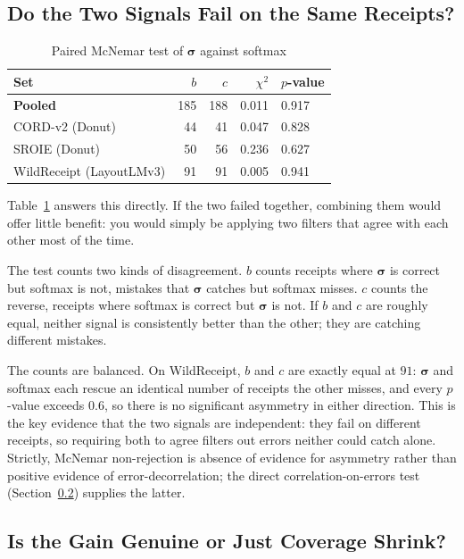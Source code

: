 \documentclass[conference]{IEEEtran}
\let\IEEEsigma\sigma
\DeclareRobustCommand{\sigma}{{\boldsymbol{\IEEEsigma}}}
\begin{document}
\subsection{Do the Two Signals Fail on the Same Receipts?}
\label{sec:results-mcnemar}

\begin{table}[t]
\centering\small
\caption{Paired McNemar test of $\sigma$ against softmax}
\label{tab:mcnemar}
\begin{tabular}{lrrrl}
\toprule
Set & $b$ & $c$ & $\chi^2$ & $p$-value \\
\midrule
\textbf{Pooled}            & 185 & 188 & 0.011 & 0.917 \\
CORD-v2     (Donut)        &  44 &  41 & 0.047 & 0.828 \\
SROIE       (Donut)        &  50 &  56 & 0.236 & 0.627 \\
WildReceipt (LayoutLMv3)   &  91 &  91 & 0.005 & 0.941 \\
\bottomrule
\end{tabular}
\end{table}

\noindent Table~\ref{tab:mcnemar} answers this directly. If the two failed together, combining them would offer
little benefit: you would simply be applying two filters that agree with each
other most of the time.

\noindent The test counts two kinds of disagreement.
$b$ counts receipts where $\sigma$ is correct but softmax is not,
mistakes that $\sigma$ catches but softmax misses. $c$ counts the
reverse, receipts where softmax is correct but $\sigma$ is not. If
$b$ and $c$ are roughly equal, neither signal is consistently better
than the other; they are catching different mistakes.

\noindent The counts are balanced. On WildReceipt, $b$ and $c$ are
exactly equal at $91$: $\sigma$ and softmax each rescue an identical number of
receipts the other misses, and every $p$-value exceeds $0.6$, so there is no
significant asymmetry in either direction. This is the key evidence that the
two signals are independent: they fail on different receipts, so requiring
both to agree filters out errors neither could catch alone. Strictly,
McNemar non-rejection is absence of evidence for asymmetry rather
than positive evidence of error-decorrelation; the direct
correlation-on-errors test (Section~\ref{sec:results-control})
supplies the latter.

\subsection{Is the Gain Genuine or Just Coverage Shrink?}
\label{sec:results-control}
\end{document}
